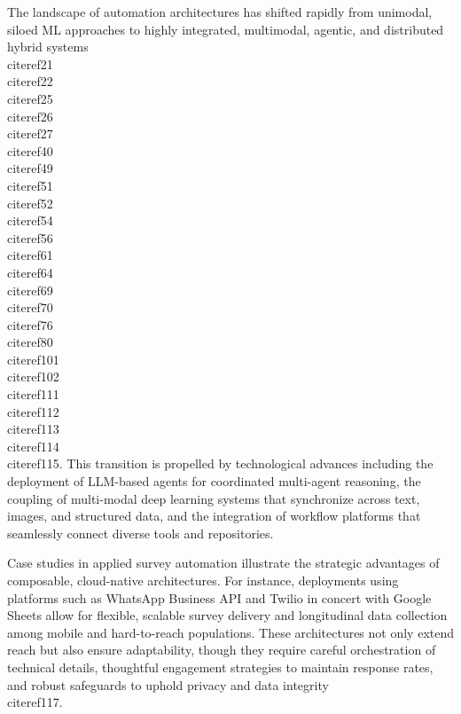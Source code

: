 \documentclass[11pt]{article}
\begin{document}
The landscape of automation architectures has shifted rapidly from unimodal, siloed ML approaches to highly integrated, multimodal, agentic, and distributed hybrid systems \\cite{ref21}\\cite{ref22}\\cite{ref25}\\cite{ref26}\\cite{ref27}\\cite{ref40}\\cite{ref49}\\cite{ref51}\\cite{ref52}\\cite{ref54}\\cite{ref56}\\cite{ref61}\\cite{ref64}\\cite{ref69}\\cite{ref70}\\cite{ref76}\\cite{ref80}\\cite{ref101}\\cite{ref102}\\cite{ref111}\\cite{ref112}\\cite{ref113}\\cite{ref114}\\cite{ref115}. This transition is propelled by technological advances including the deployment of LLM-based agents for coordinated multi-agent reasoning, the coupling of multi-modal deep learning systems that synchronize across text, images, and structured data, and the integration of workflow platforms that seamlessly connect diverse tools and repositories.

Case studies in applied survey automation illustrate the strategic advantages of composable, cloud-native architectures. For instance, deployments using platforms such as WhatsApp Business API and Twilio in concert with Google Sheets allow for flexible, scalable survey delivery and longitudinal data collection among mobile and hard-to-reach populations. These architectures not only extend reach but also ensure adaptability, though they require careful orchestration of technical details, thoughtful engagement strategies to maintain response rates, and robust safeguards to uphold privacy and data integrity \\cite{ref117}. 
\end{document}
